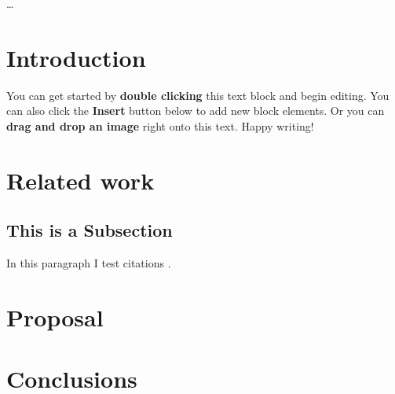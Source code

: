 


\abstract

\ldots

\section{Introduction}

You can get started by \textbf{double clicking} this text block and begin editing. You can also click the \textbf{Insert} button below to add new block elements. Or you can \textbf{drag and drop an image} right onto this text. Happy writing!

\section{Related work}
\subsection{This is a Subsection}

In this paragraph I test citations \cite{Jentzsch_2014}.

\section{Proposal}

\section{Conclusions}





